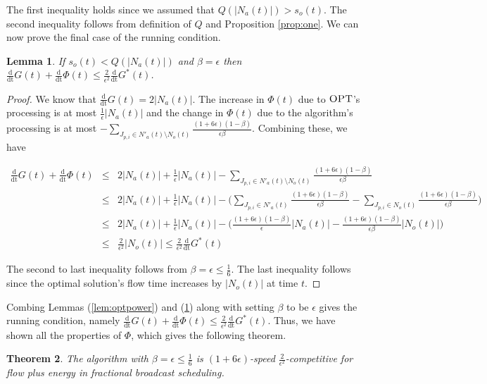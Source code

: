 \documentclass[11pt]{article}
\newtheorem{lemma}{Lemma}[section]
\newtheorem{theorem}[lemma]{Theorem}
\newcommand{\opt}{\textrm{\sc OPT}}
\newcommand{\eps}{\epsilon}
\newcommand{\ddphi}{\frac{\mathrm{d}}{\mathrm{dt}} \Phi}
\newcommand{\ddhopt}{\frac{\mathrm{d}}{\mathrm{dt}} G^*}
\newcommand{\ddg}{\frac{\mathrm{d}}{\mathrm{dt}} G}
\begin{document}
The first inequality holds since we assumed that $Q(|N_a(t)|) >  s_o(t)$.  The second inequality follows from definition of $Q$ and Proposition \ref{prop:one}. We can now prove the final case of the running condition.

\begin{lemma}\label{lem:main}
If $s_o(t) < Q(|N_a(t)|) $ and $\beta = \eps$ then $\ddg(t) + \ddphi(t) \leq \frac{2}{\eps^2} \ddhopt(t)$.
\end{lemma}
\begin{proof}
We know that $\ddg(t) = 2|N_a(t)|$.  The increase in $\Phi(t)$ due to $\opt$'s processing is at most $\frac{1}{\eps}|N_a(t)|$ and the change in $\Phi(t)$ due to the algorithm's processing is at most $-\sum_{J_{p,i} \in N'_a(t) \setminus N_o(t) } \frac{(1+6\eps)(1-\beta)}{\eps\beta}$.  Combining these, we have

\begin{eqnarray*}
\ddg(t) + \ddphi(t) &\leq& 2|N_a(t)| + \frac{1}{\eps}|N_a(t)|-\sum_{J_{p,i} \in N'_a(t) \setminus N_o(t) } \frac{(1+6\eps)(1-\beta)}{\eps\beta} \\
&\leq&  2|N_a(t)| + \frac{1}{\eps}|N_a(t)|- \Big (\sum_{J_{p,i} \in N'_a(t)  } \frac{(1+6\eps)(1-\beta)}{\eps\beta} - \sum_{J_{p,i} \in N_o(t)  } \frac{(1+6\eps)(1-\beta)}{\eps\beta} \Big ) \\
&\leq& 2|N_a(t)| + \frac{1}{\eps}|N_a(t)| -  \Big ( \frac{(1+6\eps)(1-\beta)}{\eps} |N_a(t)| -  \frac{(1+6\eps)(1-\beta)}{\eps\beta} |N_o(t)| \Big ) \\
&\leq& \frac{2}{\eps^2} |N_o(t)| \leq  \frac{2}{\eps^2} \ddhopt(t)
\end{eqnarray*}

The second to last inequality follows from $\beta = \eps \leq \frac{1}{6}$.  The last inequality follows since the optimal solution's flow time increases by $|N_o(t)|$ at time $t$.
\end{proof}


Combing Lemmas (\ref{lem:optpower}) and (\ref{lem:main}) along with setting $\beta$ to be $\eps$ gives the running condition, namely $\ddg(t) + \ddphi(t) \leq \frac{2}{\eps^2} \ddhopt(t)$. Thus, we have shown all the properties of $\Phi$, which gives the following theorem.

\begin{theorem}
The algorithm with $\beta = \eps \leq \frac{1}{6}$ is $(1+6\eps)$-speed $\frac{2}{\eps^2}$-competitive for flow plus energy in fractional broadcast scheduling.
\end{theorem}
\end{document}
